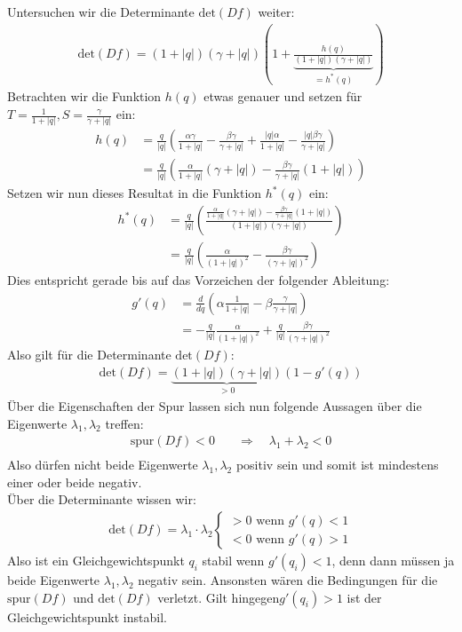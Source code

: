 \documentclass[a4paper,twoside]{article}
\begin{document}
	Untersuchen wir die Determinante \(\textrm{det}(Df)\) weiter:
	\begin{align*}
		\textrm{det}(Df) = (1 + |q|)(\gamma + |q|)\left( 1 + \underbrace{\frac{h(q)}{(1 + |q|)(\gamma + |q|)}}_{=h^*(q)} \right)
	\end{align*}
	Betrachten wir die Funktion \(h(q)\) etwas genauer und setzen für \(T = \frac{1}{1+|q|}, S = \frac{\gamma}{\gamma + |q|}\) ein:
	\begin{align*}
		h(q) &= \frac{q}{|q|}\left(
			\frac{\alpha \gamma}{1 + |q|} - \frac{\beta \gamma}{\gamma + |q|} + 
			\frac{|q| \alpha}{1+|q|} - \frac{|q| \beta\gamma}{\gamma + |q|}
		\right) \\
		&=\frac{q}{|q|}\left(
			\frac{\alpha}{1 + |q|}(\gamma + |q|) -
			 \frac{\beta \gamma}{\gamma + |q|}(1+|q|)
		\right)
	\end{align*}
	Setzen wir nun dieses Resultat in die Funktion \(h^*(q)\) ein:
	\begin{align*}
		h^*(q) &= \frac{q}{|q|}\left(
			\frac{\frac{\alpha}{1 + |q|}(\gamma + |q|) -
			 \frac{\beta \gamma}{\gamma + |q|}(1+|q|)}
			{(1 + |q|)(\gamma + |q|)}
		\right) \\
		&= \frac{q}{|q|} \left(
			\frac{\alpha}{(1+|q|)^2} - \frac{\beta \gamma}{(\gamma + |q|)^2}
		\right)
	\end{align*}
	Dies entspricht gerade bis auf das Vorzeichen der folgender Ableitung:
	\begin{align*}
		g'(q) &= \frac{d}{dq} \left(\alpha\frac{1}{1+|q|} - \beta\frac{\gamma}{\gamma+|q|}\right) \\
		&= -\frac{q}{|q|} \frac{\alpha}{(1+|q|)^2} + \frac{q}{|q|} \frac{\beta \gamma}{(\gamma + |q|)^2}
	\end{align*}
	Also gilt für die Determinante \(\textrm{det}(Df)\):
	\begin{align*}
		\textrm{det}(Df) = \underbrace{(1+|q|)(\gamma+|q|)}_{> 0}(1-g'(q))
	\end{align*}
	Über die Eigenschaften der Spur lassen sich nun folgende Aussagen über die Eigenwerte \(\lambda_1, \lambda_2\) treffen:
	\begin{align*}
		\textrm{spur}(Df) < 0 \quad &\Rightarrow \quad  \lambda_1 + \lambda_2 < 0 \\
	\end{align*}
	Also dürfen nicht beide Eigenwerte \(\lambda_1, \lambda_2\) positiv sein und somit ist mindestens einer oder beide negativ. \\
	Über die Determinante wissen wir:
	\begin{align*}
		\textrm{det}(Df) = \lambda_1 \cdot \lambda_2 \left\{ \begin{array}{l}
			> 0 \textrm{ wenn } g'(q) < 1 \\
			< 0 \textrm{ wenn } g'(q) > 1
		\end{array} \right.
	\end{align*}
	Also ist ein Gleichgewichtspunkt \(q_i\) stabil wenn \(g'(q_i) < 1\), denn dann müssen ja beide Eigenwerte \(\lambda_1, \lambda_2\) negativ sein. Ansonsten wären die Bedingungen für die \(\textrm{spur}(Df)\) und \(\textrm{det}(Df)\) verletzt. Gilt hingegen\(g'(q_i) > 1\) ist der Gleichgewichtspunkt instabil.
	
\end{document}
